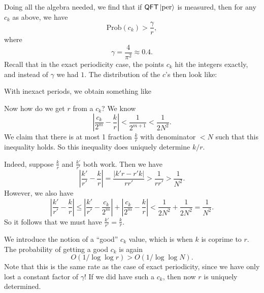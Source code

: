 Doing all the algebra needed, we find that if $\mathsf{QFT}\left\lvert \mathrm{per}\right\rangle$ is measured, then for any $c_k$ as above, we have
\[
  \mathrm{Prob}(c_k) > \frac{\gamma}{r},
\]
where
\[
  \gamma = \frac{4}{\pi^2} \approx 0.4.
\]
Recall that in the exact periodicity case, the points $c_k$ hit the integers exactly, and instead of $\gamma$ we had $1$. The distribution of the $c$'s then look like:
\begin{center}
\end{center}
With inexact periods, we obtain something like
\begin{center}
\end{center}
Now how do we get $r$ from a $c_k$? We know
\[
  \left| \frac{c_k}{2^m} - \frac{k}{r}\right| < \frac{1}{2^{m + 1}} < \frac{1}{2N^2}.
\]
We claim that there is at most 1 fraction $\frac{k}{r}$ with denominator $< N$ such that this inequality holds. So this inequality does uniquely determine $k/r$.

Indeed, suppose $\frac{k}{r}$ and $\frac{k'}{r'}$ both work. Then we have
\[
  \left|\frac{k'}{r'} - \frac{k}{r}\right| = \frac{|k'r - r'k|}{rr'} > \frac{1}{rr'} > \frac{1}{N^2}.
\]
However, we also have
\[
  \left|\frac{k'}{r'} - \frac{k}{r}\right| \leq \left|\frac{k'}{r'} - \frac{c_k}{2^m}\right| + \left|\frac{c_k}{2^m} - \frac{k}{r}\right| < \frac{1}{2N^2} + \frac{1}{2N^2} = \frac{1}{N^2}.
\]
So it follows that we must have $\frac{k'}{r'} = \frac{k}{r}$.

We introduce the notion of a ``good'' $c_k$ value, which is when $k$ is coprime to $r$. The probability of getting a good $c_k$ is again
\[
  O(1/\log \log r) > O(1/\log \log N).
\]
Note that this is the same rate as the case of exact periodicity, since we have only lost a constant factor of $\gamma$! If we did have such a $c_k$, then now $r$ is uniquely determined.

